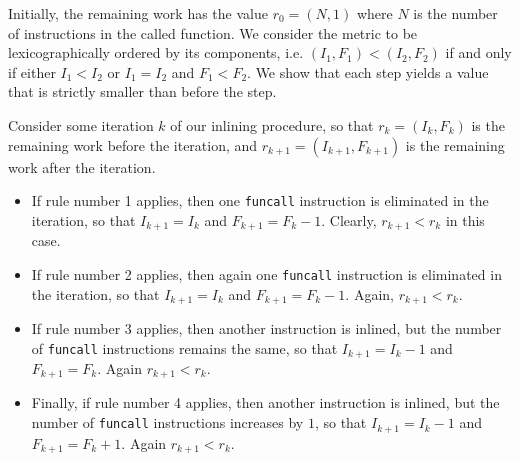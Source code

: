 Initially, the remaining work has the value $r_0 = (N,1)$ where $N$ is
the number of instructions in the called function.  We consider the
metric to be lexicographically ordered by its components, i.e. $(I_1,
F_1) < (I_2, F_2)$ if and only if either $I_1 < I_2$ or $I_1 = I_2$
and $F_1 < F_2$.  We show that each step yields a value that is
strictly smaller than before the step.

Consider some iteration $k$ of our inlining procedure, so that $r_k =
(I_k,F_k)$ is the remaining work before the iteration, and $r_{k+1} =
(I_{k+1},F_{k+1})$ is the remaining work after the iteration.

\begin{itemize}
\item If rule number 1 applies, then one \texttt{funcall} instruction
  is eliminated in the iteration, so that $I_{k+1} = I_k$ and $F_{k+1}
  = F_k-1$.  Clearly, $r_{k+1} < r_k$ in this case.
\item If rule number 2 applies, then again one \texttt{funcall}
  instruction is eliminated in the iteration, so that $I_{k+1} = I_k$
  and $F_{k+1} = F_k-1$.  Again, $r_{k+1} < r_k$.
\item If rule number 3 applies, then another instruction is inlined,
  but the number of \texttt{funcall} instructions remains the same, so
  that $I_{k+1} = I_k-1$ and $F_{k+1} = F_k$.  Again $r_{k+1} < r_k$.
\item Finally, if rule number 4 applies, then another instruction is inlined,
  but the number of \texttt{funcall} instructions increases by $1$, so
  that $I_{k+1} = I_k-1$ and $F_{k+1} = F_k+1$.  Again $r_{k+1} < r_k$.
\end{itemize}

